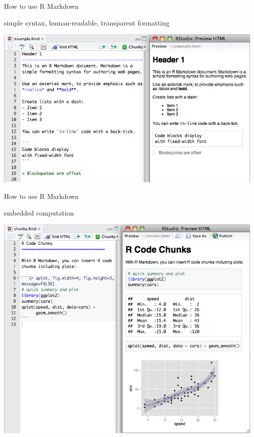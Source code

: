 \documentclass[ignorenonframetext,]{beamer}
\begin{document}
\begin{frame}{How to use R Markdown}

\begin{block}{simple syntax, human-readable, transparent formatting}

\includegraphics{images/markdownOverview.png}

\end{block}

\end{frame}

\begin{frame}{How to use R Markdown}

\begin{block}{embedded computation}

\includegraphics{images/markdownChunk.png}

\end{block}

\end{frame}
\end{document}
